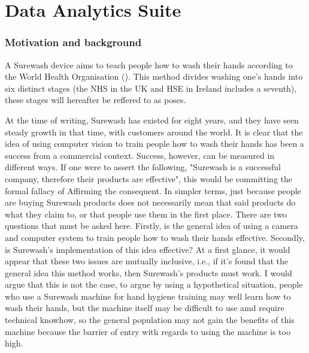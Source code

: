 \part{Data Analytics Suite}
\section{Motivation and background}
A Surewash device aims to teach people how to wash their hands according to the World Health Organisation (\cite{who_handhygiene}). This method divides washing one's hands into six distinct stages (the NHS in the UK and HSE in Ireland includes a seventh), these stages will hereafter be reffered to as poses.

At the time of writing, Surewash has existed for eight years, and they have seen steady growth in that time, with customers around the world. It is clear that the idea of using computer vision to train people how to wash their hands has been a success from a commercial context. Success, however, can be measured in different ways. If one were to assert the following, "Surewash is a successful company, therefore their products are effective", this would be committing the formal fallacy of Affirming the consequent. In simpler terms, just because people are buying Surewash products does not necessarily mean that said products do what they claim to, or that people use them in the first place. There are two questions that must be asked here. Firstly, is the general idea of using a camera and computer system to train people how to wash their hands effective. Secondly, is Surewash's implementation of this idea effective? At a first glance, it would appear that these two issues are mutually inclusive, i.e., if it's found that the general idea this method works, then Surewash's products must work. I would argue that this is not the case, to argue by using a hypothetical situation, people who use a Surewash machine for hand hygiene training may well learn how to wash their hands, but the machine itself may be difficult to use amd require technical knowhow, so the general population may not gain the benefits of this machine because the barrier of entry with regards to using the machine is too high.

